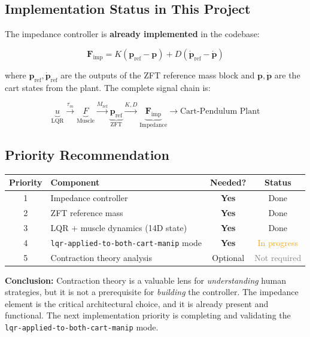 \documentclass[11pt]{article}
\begin{document}
\subsection*{Implementation Status in This Project}

The impedance controller is \textbf{already implemented} in the codebase:

\begin{equation}
    \bm{F}_\text{imp} = K(\bm{p}_\text{ref} - \bm{p}) + D(\dot{\bm{p}}_\text{ref} - \dot{\bm{p}})
\end{equation}

\noindent where $\bm{p}_\text{ref},\dot{\bm{p}}_\text{ref}$ are the outputs of the
ZFT reference mass block and $\bm{p},\dot{\bm{p}}$ are the cart states from the
plant.  The complete signal chain is:

\begin{equation}
    \underbrace{u}_{\text{LQR}}
    \xrightarrow{\tau_m}
    \underbrace{F}_{\text{Muscle}}
    \xrightarrow{M_\text{ref}}
    \underbrace{\bm{p}_\text{ref}}_{\text{ZFT}}
    \xrightarrow{K,D}
    \underbrace{\bm{F}_\text{imp}}_{\text{Impedance}}
    \longrightarrow
    \text{Cart-Pendulum Plant}
\end{equation}

\subsection*{Priority Recommendation}

\begin{center}
\begin{tabular}{clcc}
\toprule
\textbf{Priority} & \textbf{Component} & \textbf{Needed?} & \textbf{Status} \\
\midrule
1 & Impedance controller                  & \textbf{Yes} & \textcolor{green!60!black}{Done} \\
2 & ZFT reference mass                    & \textbf{Yes} & \textcolor{green!60!black}{Done} \\
3 & LQR + muscle dynamics (14D state)     & \textbf{Yes} & \textcolor{green!60!black}{Done} \\
4 & \texttt{lqr-applied-to-both-cart-manip} mode & \textbf{Yes} & \textcolor{orange}{In progress} \\
5 & Contraction theory analysis           & Optional     & \textcolor{gray}{Not required} \\
\bottomrule
\end{tabular}
\end{center}

\medskip
\noindent\textbf{Conclusion:}
Contraction theory is a valuable lens for \emph{understanding} human strategies,
but it is not a prerequisite for \emph{building} the controller.
The impedance element is the critical architectural choice, and it is already
present and functional.  The next implementation priority is completing and
validating the \texttt{lqr-applied-to-both-cart-manip} mode.
\end{document}
